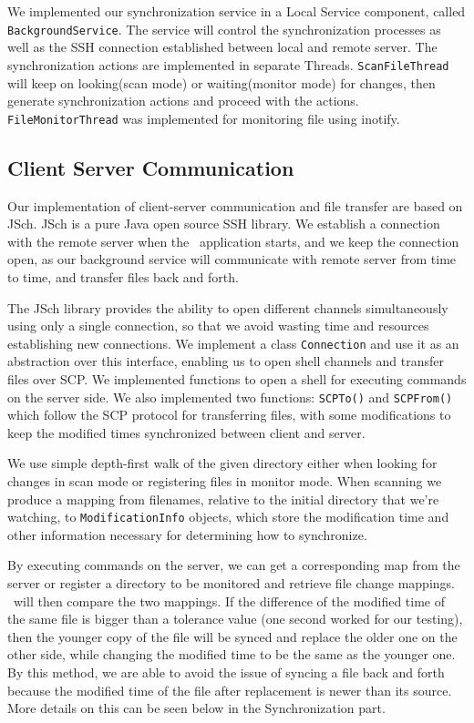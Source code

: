 We implemented our synchronization service in a Local Service component, called \verb+BackgroundService+. The service will 
control the synchronization processes as well as the SSH connection established between local and remote server. The  
synchronization actions are implemented in separate Threads. \verb+ScanFileThread+ will keep on looking(scan mode) or 
waiting(monitor mode) for changes, then generate synchronization actions and proceed with the actions. \verb+FileMonitorThread+ was implemented for monitoring file using inotify.

\subsection{Client Server Communication}
Our implementation of client-server communication and file transfer are based on JSch. JSch is a pure Java open source SSH library. We establish a connection with the remote server when the \teledroid\ application starts, and we keep the connection open, as our background service will communicate with remote server from time to time, and transfer files back and forth. 

The JSch library provides the ability to open different channels simultaneously using only a single connection, so that we avoid 
wasting time and resources establishing new connections. We implement a class \verb+Connection+ and use it as an abstraction over this interface, enabling us to open shell channels and transfer files over SCP. We implemented functions to open 
a shell for executing commands on the server side.  
We also implemented two functions: \verb+SCPTo()+ and \verb+SCPFrom()+ which follow the SCP protocol for transferring files, with some modifications to keep the modified times synchronized between client and server. 

We use simple depth-first walk of the given directory either when looking for changes in scan mode or registering files in monitor mode. When scanning we produce a mapping from filenames, relative to the initial directory that we're watching, to \verb+ModificationInfo+ objects, which store the modification time and other information necessary for determining how to synchronize.

By executing commands on the server, we can get a corresponding map from the server or register a directory to be monitored  and retrieve file change mappings. \teledroid\ will then compare the two mappings. If the difference of the modified time of the same file is bigger than a tolerance value (one second worked for our testing), then the younger copy of the file will be synced and replace the older one on the other side, while changing the modified time to be the same as the younger one. By this method, we are able to avoid the issue of syncing a file back and forth because the modified time of the file after replacement is newer than its source. More details on this can be seen below in the Synchronization part.

